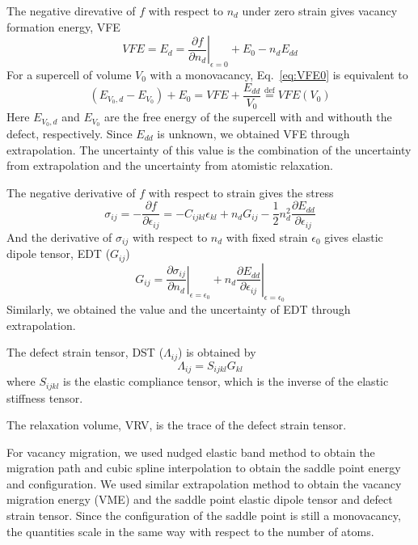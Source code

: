 \documentclass[%
 reprint,
 amsmath,amssymb,
 aps,
]{revtex4-1}
\begin{document}
The negative direvative of $f$ with respect to $n_d$ under zero strain gives vacancy formation energy, VFE
\begin{equation}
  \label{eq:VFE0}
  \mathit{VFE} = E_d = \left.\frac{\partial f}{\partial n_d}\right|_{\epsilon = 0} + E_{0} - n_d E_{dd}
\end{equation}
For a supercell of volume $V_0$ with a monovacancy, Eq.~\ref{eq:VFE0} is equivalent to
\begin{equation}
  (E_{V_0, d} - E_{V_0}) + E_{0} = \mathit{VFE} + \frac{E_{dd}}{V_0} \stackrel{\mathrm{def}}{=} \mathit{VFE}(V_0)
\end{equation}
Here $E_{V_0, d}$ and $E_{V_0}$ are the free energy of the supercell with and withouth the defect, respectively.
Since $E_{dd}$ is unknown, we obtained VFE through extrapolation.
The uncertainty of this value is the combination of the uncertainty from extrapolation and the uncertainty from atomistic relaxation.

The negative derivative of $f$ with respect to strain gives the stress
\begin{equation}
  \label{eq:stress}
  \sigma_{ij} = -\frac{\partial f}{\partial \epsilon_{ij}}
  = -C_{ijkl}\epsilon_{kl} + n_dG_{ij} - \frac{1}{2}n_d^2\frac{\partial E_{dd}}{\partial \epsilon_{ij}}
\end{equation}
And the derivative of $\sigma_{ij}$ with respect to $n_d$ with fixed strain $\epsilon_0$ gives elastic dipole tensor, EDT ($G_{ij}$)
\begin{equation}
  \label{eq:EDT}
  G_{ij} = \left.\frac{\partial \sigma_{ij}}{\partial n_d}\right|_{\epsilon = \epsilon_0}
  + n_d \left.\frac{\partial E_{dd}}{\partial \epsilon_{ij}}\right|_{\epsilon = \epsilon_0}
\end{equation}
Similarly, we obtained the value and the uncertainty of EDT through extrapolation.

The defect strain tensor, DST ($\Lambda_{ij}$) is obtained by
\begin{equation}
  \label{eq:DST}
  \Lambda_{ij} = S_{ijkl} G_{kl}
\end{equation}
where $S_{ijkl}$ is the elastic compliance tensor, which is the inverse of the elastic stiffness tensor.

The relaxation volume, VRV, is the trace of the defect strain tensor.

For vacancy migration, we used nudged elastic band method to obtain the migration path and cubic spline interpolation to obtain the saddle point energy and configuration.
We used similar extrapolation method to obtain the vacancy migration energy (VME) and the saddle point elastic dipole tensor and defect strain tensor.
Since the configuration of the saddle point is still a monovacancy, the quantities scale in the same way with respect to the number of atoms.
\end{document}

